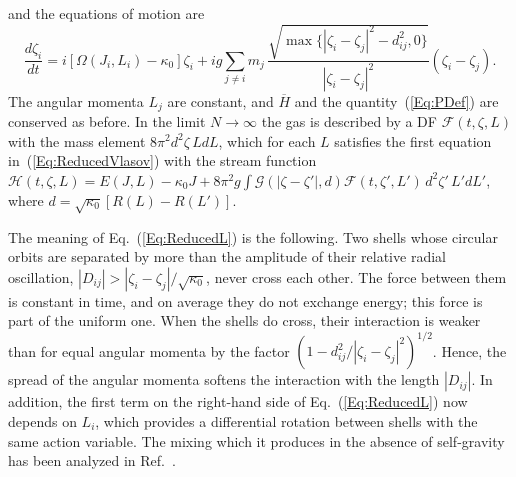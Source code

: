 \documentclass[prd,aps,nofootinbib,superscriptaddress,amsmath,amssymb]{revtex4}
\begin{document}
and the equations of motion are
\begin{equation}
\frac{d\zeta_i}{dt} = i\left[ \Omega(J_i,L_i) - \kappa_0 \right]\zeta_i
 + i g\sum\limits_{j\neq i} m_j\,\frac{\sqrt{\max\{ |\zeta_i - \zeta_j|^2 - d_{ij}^2,0 \}}}{|\zeta_i - \zeta_j|^2}\left( \zeta_i - \zeta_j \right).
\label{Eq:ReducedL}
\end{equation}
The angular momenta $L_j$ are constant, and $\overline{H}$ and the quantity~(\ref{Eq:PDef}) are conserved as before. In the limit $N\to \infty$ the gas is described by a DF $\mathcal{F}(t,\zeta,L)$ with the mass element $8\pi^2 d^2\zeta\, L dL$, which for each $L$ satisfies the first equation in~(\ref{Eq:ReducedVlasov}) with the stream function $\mathcal{H}(t,\zeta,L) = E(J,L) - \kappa_0 J + 8\pi^2 g\int\mathcal{G}(|\zeta - \zeta'|,d)\mathcal{F}(t,\zeta',L')\, d^2\zeta'\, L' dL'$, where $d = \sqrt{\kappa_0}[R(L) - R(L')]$.

The meaning of Eq.~(\ref{Eq:ReducedL}) is the following. Two shells whose circular orbits are separated by more than the amplitude of their relative radial oscillation, $|D_{ij}| > |\zeta_i - \zeta_j|/\sqrt{\kappa_0}$, never cross each other. The force between them is constant in time, and on average they do not exchange energy; this force is part of the uniform one. When the shells do cross, their interaction is weaker than for equal angular momenta by the factor $(1 - d_{ij}^2/|\zeta_i - \zeta_j|^2)^{1/2}$. Hence, the spread of the angular momenta softens the interaction with the length $|D_{ij}|$. In addition, the first term on the right-hand side of Eq.~(\ref{Eq:ReducedL}) now depends on $L_i$, which provides a differential rotation between shells with the same action variable. The mixing which it produces in the absence of self-gravity has been analyzed in Ref.~\cite{pRoS20}.
\end{document}
